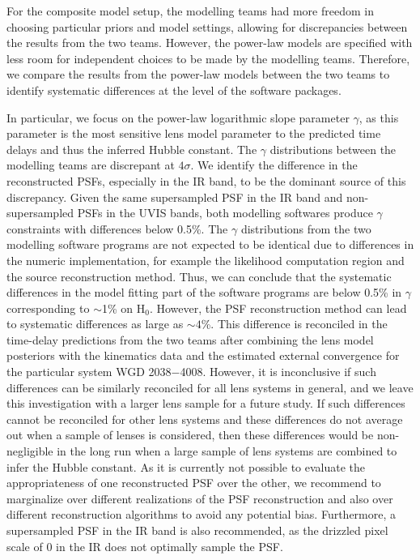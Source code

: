 \documentclass[longauth]{aa}
\newcommand{\lensname}{WGD 2038$-$4008}
\newcommand{\ajsiii}[1]{{{#1}}}
\newcommand{\kw}[1]{{{#1}}}
\begin{document}
For the composite model setup, the modelling teams had more freedom in choosing particular priors and model settings, allowing for discrepancies between the results from the two teams. However, the power-law models are specified with less room for independent choices to be made by  the modelling teams. Therefore, we compare the results from the power-law models between the two teams to identify systematic differences at the level of the software packages. %

In particular, we focus on the power-law logarithmic slope parameter $\gamma$, as this parameter is the most sensitive lens model parameter to the predicted time delays and thus the inferred Hubble constant. The $\gamma$ distributions between the modelling teams are discrepant at $4\sigma$. We identify the difference in the reconstructed PSFs, especially in the IR band, to be the dominant source of this discrepancy. Given the same supersampled PSF in the IR band and non-supersampled PSFs in the UVIS bands, both modelling softwares produce $\gamma$ constraints with differences below 0.5\%. The $\gamma$ distributions from the two modelling software programs are not expected to be identical due to differences in the numeric implementation, for example the likelihood computation region and the source reconstruction method. Thus, we can conclude that the systematic differences in the model fitting part of the software programs are below 0.5\% in $\gamma$ corresponding to \ajsiii{$\sim$1\%} on H$_0$. However, the PSF reconstruction method can lead to systematic differences as large as $\sim4$\%. This difference is reconciled in the time-delay predictions from the two teams after combining the lens model posteriors with the kinematics data and the estimated external convergence for the particular system \lensname. However, it is inconclusive if such differences can be similarly reconciled for all lens systems in general, and we leave this investigation with a larger lens sample for a future study. If such differences cannot be reconciled for other lens systems and these differences do not average out when a sample of lenses is considered, then these differences would be non-negligible in the long run when a large sample of lens systems are combined to infer the Hubble constant. As it is currently not possible to evaluate the appropriateness of one reconstructed PSF over the other, we recommend to marginalize over different realizations of the PSF reconstruction and also over different reconstruction algorithms to avoid any potential bias. Furthermore, a supersampled PSF in the IR band is also recommended, as the drizzled pixel scale of 0 in the IR does not optimally sample the PSF.
\end{document}
